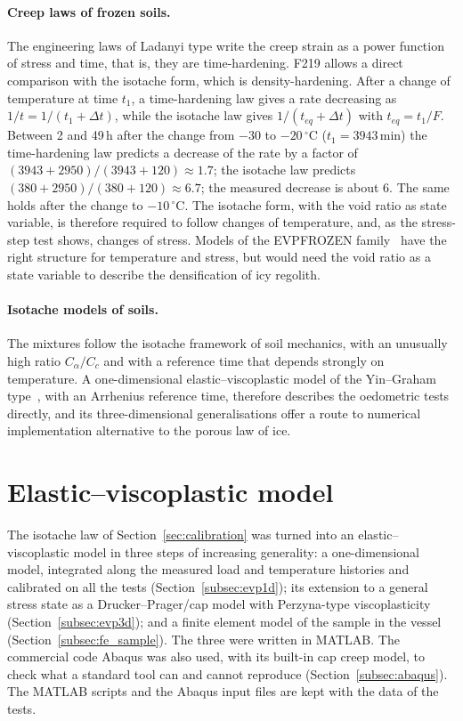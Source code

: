 \paragraph{Creep laws of frozen soils.} The engineering laws of Ladanyi type write the creep strain as a power function of stress and time, that is, they are time-hardening. F219 allows a direct comparison with the isotache form, which is density-hardening. After a change of temperature at time $t_1$, a time-hardening law gives a rate decreasing as $1/t = 1/(t_1+\Delta t)$, while the isotache law gives $1/(t_{eq}+\Delta t)$ with $t_{eq} = t_1/F$. Between 2 and 49\,h after the change from $-30$ to $-20\,^\circ$C ($t_1 = 3943$\,min) the time-hardening law predicts a decrease of the rate by a factor of $(3943+2950)/(3943+120)\approx1.7$; the isotache law predicts $(380+2950)/(380+120)\approx6.7$; the measured decrease is about 6. The same holds after the change to $-10\,^\circ$C. The isotache form, with the void ratio as state variable, is therefore required to follow changes of temperature, and, as the stress-step test shows, changes of stress. Models of the EVPFROZEN family~\cite{cudmani2022} have the right structure for temperature and stress, but would need the void ratio as a state variable to describe the densification of icy regolith.

\paragraph{Isotache models of soils.} The mixtures follow the isotache framework of soil mechanics, with an unusually high ratio $C_\alpha/C_c$ and with a reference time that depends strongly on temperature. A one-dimensional elastic--viscoplastic model of the Yin--Graham type~\cite{yin1989}, with an Arrhenius reference time, therefore describes the oedometric tests directly, and its three-dimensional generalisations offer a route to numerical implementation alternative to the porous law of ice.

\section{Elastic--viscoplastic model}
\label{sec:implementation}

The isotache law of Section~\ref{sec:calibration} was turned into an elastic--viscoplastic model in three steps of increasing generality: a one-dimensional model, integrated along the measured load and temperature histories and calibrated on all the tests (Section~\ref{subsec:evp1d}); its extension to a general stress state as a Drucker--Prager/cap model with Perzyna-type viscoplasticity (Section~\ref{subsec:evp3d}); and a finite element model of the sample in the vessel (Section~\ref{subsec:fe_sample}). The three were written in MATLAB. The commercial code Abaqus was also used, with its built-in cap creep model, to check what a standard tool can and cannot reproduce (Section~\ref{subsec:abaqus}). The MATLAB scripts and the Abaqus input files are kept with the data of the tests.

